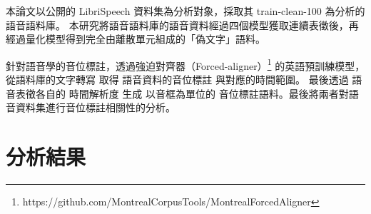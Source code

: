        本論文以公開的 LibriSpeech 資料集為分析對象，採取其 train-clean-100 為分析的語音語料庫。
本研究將語音語料庫的語音資料經過四個模型獲取連續表徵後，再經過量化模型得到完全由離散單元組成的「偽文字」語料。

        針對語音學的音位標註，透過強迫對齊器（Forced-aligner）\footnote{https://github.com/MontrealCorpusTools/Montreal­Forced­Aligner } 的英語預訓練模型， 從語料庫的文字轉寫 取得 語音資料的音位標註 與對應的時間範圍。 最後透過 語音表徵各自的 時間解析度 生成 以音框為單位的 音位標註語料。最後將兩者對語音資料集進行音位標註相關性的分析。

\section{分析結果}




